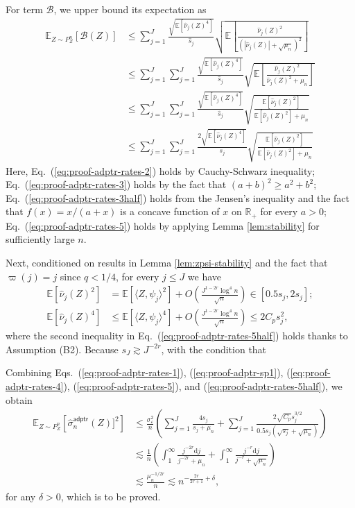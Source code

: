 \documentclass[11pt,a4paper]{article}
\renewcommand{\hat}{\widehat}
\theoremstyle{definition}
\theoremstyle{plain}
\theoremstyle{remark}
\newcommand{\ud}{\mathrm d}
\newcommand{\mB}{\mathcal B}
\newcommand{\adptr}{\mathsf{adptr}}
\begin{document}
For term $\mB$, we upper bound its expectation as
\begin{align}
\mathbb E_{Z\sim P_Z^n}[\mB(Z)] &\leq \sum_{j=1}^{J}\frac{\sqrt{\mathbb E\left[\hat\nu_j(Z)^4\right]}}{\hat s_j}\sqrt{\mathbb E\left[\frac{\hat\nu_j(Z)^2}{(|\hat\nu_j(Z)|+\sqrt{\mu_n})^2}\right]}\label{eq:proof-adptr-rates-2}\\
&\leq\sum_{j=1}^{J}\sum_{j=1}^{J}\frac{\sqrt{\mathbb E\left[\hat\nu_j(Z)^4\right]}}{\hat s_j}\sqrt{\mathbb E\left[\frac{\hat\nu_j(Z)^2}{\hat\nu_j(Z)^2+\mu_n}\right]} \label{eq:proof-adptr-rates-3}\\
&\leq \sum_{j=1}^{J}\sum_{j=1}^{J}\frac{\sqrt{\mathbb E\left[\hat\nu_j(Z)^4\right]}}{\hat s_j}\sqrt{\frac{\mathbb E[\hat\nu_j(Z)^2]}{\mathbb E[\hat\nu_j(Z)^2]+\mu_n}}\label{eq:proof-adptr-rates-3half}\\
&\leq \sum_{j=1}^{J}\sum_{j=1}^{J}\frac{2\sqrt{\mathbb E\left[\hat\nu_j(Z)^4\right]}}{s_j}\sqrt{\frac{\mathbb E[\hat\nu_j(Z)^2]}{\mathbb E[\hat\nu_j(Z)^2]+\mu_n}}\label{eq:proof-adptr-rates-4}
\end{align}
Here, Eq.~(\ref{eq:proof-adptr-rates-2}) holds by Cauchy-Schwarz inequality;
Eq.~(\ref{eq:proof-adptr-rates-3}) holds by the fact that $(a+b)^2\geq a^2+b^2$;
Eq.~(\ref{eq:proof-adptr-rates-3half}) holds from the Jensen's inequality and the fact that $f(x)=x/(a+x)$ is a concave function of $x$ on $\mathbb R_+$ for every $a>0$;
Eq.~(\ref{eq:proof-adptr-rates-5}) holds by applying Lemma \ref{lem:stability} for sufficiently large $n$.

Next, conditioned on results in Lemma \ref{lem:zpsi-stability} and the fact that $\varpi(j)=j$ since $q<1/4$, for every $j\leq J$ we have
\begin{align}
\mathbb E[\hat\nu_j(Z)^2] &= \mathbb E[\langle Z,\psi_j\rangle^2] + O\left(\frac{J^{1-2r}\log^4 n}{\sqrt{n}}\right) \in [0.5s_j,2s_j];\label{eq:proof-adptr-rates-5}\\
\mathbb E[\hat\nu_j(Z)^4] &\leq \mathbb E[\langle Z,\psi_j\rangle^4] + O\left(\frac{J^{1-2r}\log^4 n}{\sqrt{n}}\right)\leq 2C_p s_j^2,\label{eq:proof-adptr-rates-5half}
\end{align}
where the second inequality in Eq.~(\ref{eq:proof-adptr-rates-5half}) holds thanks to Assumption (B2).
Because $s_J\gtrsim J^{-2r}$, with the condition that 

Combining Eqs.~(\ref{eq:proof-adptr-rates-1}), (\ref{eq:proof-adptr-sp1}), (\ref{eq:proof-adptr-rates-4}), (\ref{eq:proof-adptr-rates-5}), and (\ref{eq:proof-adptr-rates-5half}), we obtain
\begin{align*}
\mathbb E_{Z\sim P_Z^n}\left[\hat\sigma_n^\adptr(Z)]^2\right]
&\leq \frac{\sigma_\varepsilon^2}{n}\left(\sum_{j=1}^J\frac{4s_j}{s_j+\mu_n} + \sum_{j=1}^J\frac{2\sqrt{C_p}s_j^{3/2}}{0.5s_j(\sqrt{s_j}+\sqrt{\mu_n})}\right)\\
&\lesssim \frac{1}{n}\left(\int_1^{\infty}\frac{j^{-2r}\ud j}{j^{-2r}+\mu_n} + \int_1^{\infty}\frac{j^{-r}\ud j}{j^{-r}+\sqrt{\mu_n}}\right)\\
&\lesssim \frac{\mu_n^{-1/2r}}{n}\lesssim n^{-\frac{2r}{2r+1}+\delta},
\end{align*}
for any $\delta>0$,
which is to be proved.
 




\end{document}
